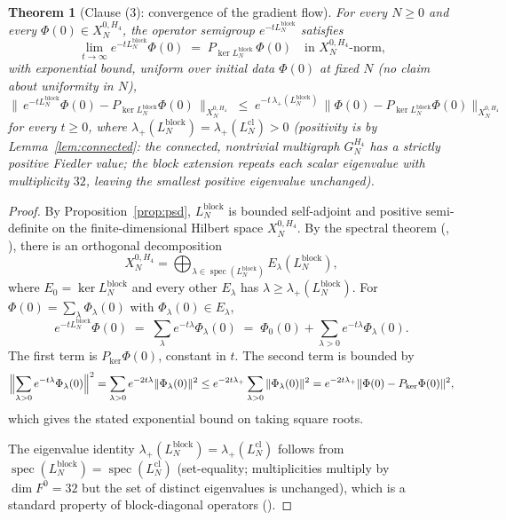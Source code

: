 \documentclass[11pt]{article}
\newcommand{\spec}{\operatorname{spec}}
\newtheorem{theorem}{Theorem}[section]
\theoremstyle{definition}
\begin{document}
\begin{theorem}[Clause (3): convergence of the gradient flow]
\label{thm:convergence}
For every $N \geq 0$ and every $\Phi(0) \in X_N^{0, H_4}$, the
operator semigroup $e^{-t L_N^{\mathrm{block}}}$ satisfies
\[
  \lim_{t \to \infty} e^{-t L_N^{\mathrm{block}}} \Phi(0)
  \;=\; P_{\ker L_N^{\mathrm{block}}}\,\Phi(0)
  \quad \text{in } X_N^{0, H_4}\text{-norm,}
\]
with exponential bound, uniform over initial data $\Phi(0)$ at
fixed $N$ (no claim about uniformity in $N$),
\[
  \bigl\|\, e^{-t L_N^{\mathrm{block}}} \Phi(0)
        - P_{\ker L_N^{\mathrm{block}}}\Phi(0) \,\bigr\|_{X_N^{0, H_4}}
  \;\leq\;
  e^{-t \, \lambda_{+}(L_N^{\mathrm{block}})}
  \,\bigl\|\Phi(0) - P_{\ker L_N^{\mathrm{block}}}\Phi(0)\bigr\|_{X_N^{0, H_4}}
\]
for every $t \geq 0$, where $\lambda_{+}(L_N^{\mathrm{block}}) =
\lambda_{+}(L^{\mathrm{cl}}_N) > 0$ (positivity is by
Lemma~\ref{lem:connected}: the connected, nontrivial multigraph
$G_N^{H_4}$ has a strictly positive Fiedler value; the block
extension repeats each scalar eigenvalue with multiplicity $32$,
leaving the smallest positive eigenvalue unchanged).
\end{theorem}

\begin{proof}
By Proposition~\ref{prop:psd}, $L_N^{\mathrm{block}}$ is bounded
self-adjoint and positive semi-definite on the finite-dimensional
Hilbert space $X_N^{0, H_4}$. By the spectral theorem
(\cite[Ch.~VIII.5]{ReedSimonI},
\cite[Ch.~6.2]{HornJohnson}), there is an orthogonal decomposition
\[
  X_N^{0, H_4} = \bigoplus_{\lambda \in \spec(L_N^{\mathrm{block}})}
                  E_\lambda(L_N^{\mathrm{block}}),
\]
where $E_0 = \ker L_N^{\mathrm{block}}$ and every other
$E_\lambda$ has $\lambda \geq \lambda_{+}(L_N^{\mathrm{block}})$.
For $\Phi(0) = \sum_\lambda \Phi_\lambda(0)$ with
$\Phi_\lambda(0) \in E_\lambda$,
\[
  e^{-t L_N^{\mathrm{block}}} \Phi(0)
  \;=\; \sum_\lambda e^{-t\lambda} \Phi_\lambda(0)
  \;=\; \Phi_0(0) + \sum_{\lambda > 0} e^{-t\lambda} \Phi_\lambda(0).
\]
The first term is $P_{\ker} \Phi(0)$, constant in $t$. The
second term is bounded by
\[
  \Bigl\| \sum_{\lambda > 0} e^{-t\lambda} \Phi_\lambda(0)
  \Bigr\|^{2}
  = \sum_{\lambda > 0} e^{-2t\lambda} \|\Phi_\lambda(0)\|^{2}
  \leq e^{-2t\lambda_{+}}
       \sum_{\lambda > 0} \|\Phi_\lambda(0)\|^{2}
  = e^{-2t\lambda_{+}}
    \|\Phi(0) - P_{\ker}\Phi(0)\|^{2},
\]
which gives the stated exponential bound on taking square roots.

The eigenvalue identity $\lambda_{+}(L_N^{\mathrm{block}}) =
\lambda_{+}(L^{\mathrm{cl}}_N)$ follows from
$\spec(L_N^{\mathrm{block}}) = \spec(L^{\mathrm{cl}}_N)$
(set-equality; multiplicities multiply by $\dim F^0 = 32$ but the
set of distinct eigenvalues is unchanged), which is a standard
property of block-diagonal operators
(\cite[Ch.~6.4]{HornJohnson}).
\end{proof}
\end{document}
